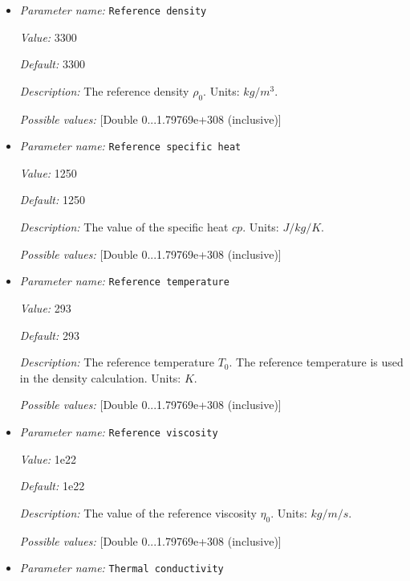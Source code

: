 \begin{itemize}
\item {\it Parameter name:} {\tt Reference density}
\label{parameters:Material model/Drucker Prager/Reference density}


{\it Value:} 3300


{\it Default:} 3300


{\it Description:} The reference density $\rho_0$. Units: $kg/m^3$.


{\it Possible values:} [Double 0...1.79769e+308 (inclusive)]
\item {\it Parameter name:} {\tt Reference specific heat}
\label{parameters:Material model/Drucker Prager/Reference specific heat}


{\it Value:} 1250


{\it Default:} 1250


{\it Description:} The value of the specific heat $cp$. Units: $J/kg/K$.


{\it Possible values:} [Double 0...1.79769e+308 (inclusive)]
\item {\it Parameter name:} {\tt Reference temperature}
\label{parameters:Material model/Drucker Prager/Reference temperature}


{\it Value:} 293


{\it Default:} 293


{\it Description:} The reference temperature $T_0$. The reference temperature is used in the density calculation. Units: $K$.


{\it Possible values:} [Double 0...1.79769e+308 (inclusive)]
\item {\it Parameter name:} {\tt Reference viscosity}
\label{parameters:Material model/Drucker Prager/Reference viscosity}


{\it Value:} 1e22


{\it Default:} 1e22


{\it Description:} The value of the reference viscosity $\eta_0$. Units: $kg/m/s$.


{\it Possible values:} [Double 0...1.79769e+308 (inclusive)]
\item {\it Parameter name:} {\tt Thermal conductivity}
\label{parameters:Material model/Drucker Prager/Thermal conductivity}



\end{itemize}

